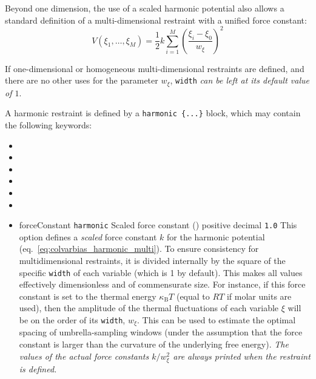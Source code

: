Beyond one dimension, the use of a scaled harmonic potential also allows a standard definition of a multi-dimensional restraint with a unified force constant:
\begin{equation}
  \label{eq:colvarbias_harmonic_multi}
  V\left(\xi_{1}, \ldots, \xi_{M}\right) = \frac{1}{2} k \sum_{i=1}^{M} \left(\frac{\xi_{i} - \xi_0}{w_{\xi}}\right)^2
\end{equation}

If one-dimensional or homogeneous multi-dimensional restraints are defined, and there are no other uses for the parameter $w_{\xi}$, \texttt{width} \emph{can be left at its default value of $1$}.

A harmonic restraint is defined by a \texttt{harmonic~\{...\}} block, which may contain the following keywords:
\begin{itemize}

\item {}
\item {}
\item {}
\item {}
\item {}
\item {}

\item %
  \keydef
    {forceConstant}{%
    \texttt{harmonic}}{%
    Scaled force constant (\energyunit)}{%
    positive decimal}{%
    \texttt{1.0}}{%
    This option defines a \emph{scaled} force constant $k$ for the harmonic potential (eq.~\ref{eq:colvarbias_harmonic_multi}).
    To ensure consistency for multidimensional restraints, it is divided internally by the square of the specific \texttt{width} of each variable (which is 1 by default).
    This makes all values effectively dimensionless and of commensurate size.
    For instance, if this force constant is set to the thermal energy $\kappa_{\mathrm{B}}T$ (equal to $RT$ if molar units are used), then the amplitude of the thermal fluctuations of each variable $\xi$ will be on the order of its \texttt{width}, $w_{\xi}$.
    This can be used to estimate the optimal spacing of umbrella-sampling windows (under the assumption that the force constant is larger than the curvature of the underlying free energy).
    \emph{The values of the actual force constants $k/w_{\xi}^2$ are always printed when the restraint is defined.}
  }


\end{itemize}

